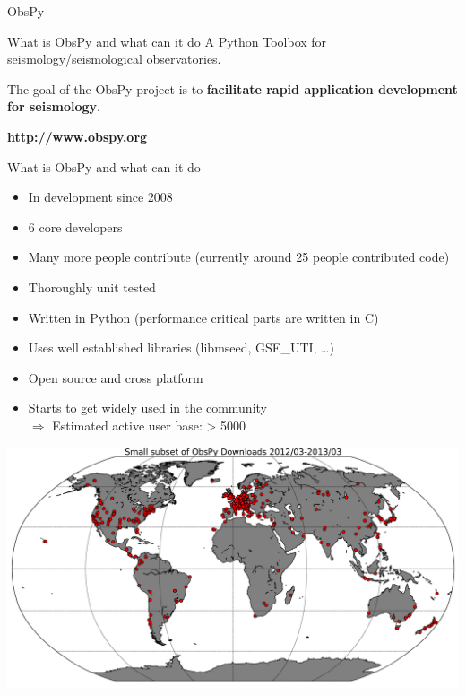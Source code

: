 \documentclass[handout]{beamer}
\begin{document}
\begin{frame}[plain]
        \begin{center}
        \textcolor{lmu@darkgreen}{\Large{ObsPy}}
        \end{center}
\end{frame}

\begin{frame}[plain]{What is ObsPy and what can it do}
    A Python Toolbox for seismology/seismological observatories.

    \vspace{2em}

    The goal of the ObsPy project is to \textbf{facilitate rapid application development for seismology}.

    \vspace{3em}

    \large
    \begin{center}
        \textbf{http://www.obspy.org}
    \end{center}
\end{frame}


\begin{frame}{What is ObsPy and what can it do}
    \begin{itemize}
        \item In development since 2008
        \item 6 core developers
        \item Many more people contribute (currently around 25 people contributed code)
        \item Thoroughly unit tested
        \item Written in Python (performance critical parts are written in C)
        \item Uses well established libraries (libmseed, GSE\_UTI, \dots)
        \item Open source and cross platform
        \item Starts to get widely used in the community \\ $\Rightarrow$ Estimated active user base: > 5000
    \end{itemize}
\end{frame}

\begin{frame}[plain]
\includegraphics[width=\textwidth]{./Scripts/ObsPyUsers.pdf}
\end{frame}
\end{document}
